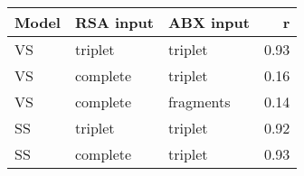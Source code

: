 \begin{tabular}{lllr}
\toprule
Model & RSA input &  ABX input &    r \\
\midrule
   VS &   triplet &    triplet & 0.93 \\
   VS &  complete &    triplet & 0.16 \\
   VS &  complete &  fragments & 0.14 \\
   SS &   triplet &    triplet & 0.92 \\
   SS &  complete &    triplet & 0.93 \\
\bottomrule
\end{tabular}

